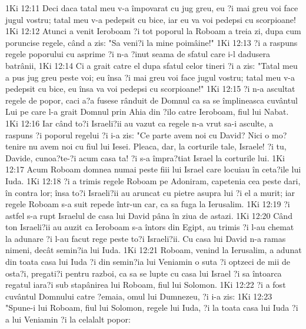 1Ki 12:11  Deci daca tatal meu v-a împovarat cu jug greu, eu ?i mai greu voi face jugul vostru; tatal meu v-a pedepsit cu bice, iar eu va voi pedepsi cu scorpioane!
1Ki 12:12  Atunci a venit Ieroboam ?i tot poporul la Roboam a treia zi, dupa cum poruncise regele, când a zis: "Sa veni?i la mine poimâine!"
1Ki 12:13  ?i a raspuns regele poporului cu asprime ?i n-a ?inut seama de sfatul care i-l dadusera batrânii,
1Ki 12:14  Ci a grait catre el dupa sfatul celor tineri ?i a zis: "Tatal meu a pus jug greu peste voi; eu însa ?i mai greu voi face jugul vostru; tatal meu v-a pedepsit cu bice, eu însa va voi pedepsi cu scorpioane!"
1Ki 12:15  ?i n-a ascultat regele de popor, caci a?a fusese rânduit de Domnul ca sa se împlineasca cuvântul Lui pe care l-a grait Domnul prin Ahia din ?ilo catre Ieroboam, fiul lui Nabat.
1Ki 12:16  Iar când to?i Israeli?ii au vazut ca regele n-a vrut sa-i asculte, a raspuns ?i poporul regelui ?i i-a zis: "Ce parte avem noi cu David? Nici o mo?tenire nu avem noi cu fiul lui Iesei. Pleaca, dar, la corturile tale, Israele! ?i tu, Davide, cunoa?te-?i acum casa ta! ?i s-a împra?tiat Israel la corturile lui.
1Ki 12:17  Acum Roboam domnea numai peste fiii lui Israel care locuiau în ceta?ile lui Iuda.
1Ki 12:18  ?i a trimis regele Roboam pe Adoniram, capetenia cea peste dari, în contra lor; însa to?i Israeli?ii au aruncat cu pietre asupra lui ?i el a murit; iar regele Roboam s-a suit repede într-un car, ca sa fuga la Ierusalim.
1Ki 12:19  ?i astfel s-a rupt Israelul de casa lui David pâna în ziua de astazi.
1Ki 12:20  Când ton Israeli?ii au auzit ca Ieroboam s-a întors din Egipt, au trimis ?i l-au chemat la adunare ?i l-au facut rege peste to?i Israeli?ii. Cu casa lui David n-a ramas nimeni, decât semin?ia lui Iuda.
1Ki 12:21  Roboam, venind la Ierusalim, a adunat din toata casa lui Iuda ?i din semin?ia lui Veniamin o suta ?i optzeci de mii de osta?i, pregati?i pentru razboi, ca sa se lupte cu casa lui Israel ?i sa întoarca regatul iara?i sub stapânirea lui Roboam, fiul lui Solomon.
1Ki 12:22  ?i a fost cuvântul Domnului catre ?emaia, omul lui Dumnezeu, ?i i-a zis:
1Ki 12:23  "Spune-i lui Roboam, fiul lui Solomon, regele lui Iuda, ?i la toata casa lui Iuda ?i a lui Veniamin ?i la celalalt popor:
